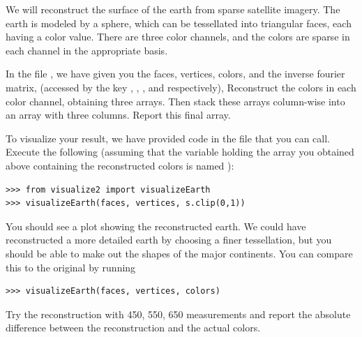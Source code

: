 \begin{problem}
We will reconstruct the surface of the earth from sparse satellite imagery. The earth is modeled by a sphere,
which can be tessellated into triangular faces, each having a color value. There are three color 
channels, and the colors are sparse in each channel in the appropriate basis. 

In the file , we have given you the faces, vertices, colors, and the inverse fourier matrix, (accessed by the key , , , and  respectively),
Reconstruct the colors in each color channel, obtaining
three arrays. Then stack these arrays column-wise into an array with three columns. Report this final array.

To visualize your result, we have provided code in the file  that you can call.
Execute the following (assuming that the variable holding the array
you obtained above containing the reconstructed colors is named ):
\begin{lstlisting}
>>> from visualize2 import visualizeEarth
>>> visualizeEarth(faces, vertices, s.clip(0,1))
\end{lstlisting}
You should see a plot showing the reconstructed earth. We could have reconstructed a more detailed earth by choosing a finer tessellation, but you should be able to make out the shapes of the major continents. You can compare this to the original by running
\begin{lstlisting}
>>> visualizeEarth(faces, vertices, colors)
\end{lstlisting}

Try the reconstruction with 450, 550, 650 measurements and report the absolute difference between the reconstruction and the actual colors.
\end{problem}
